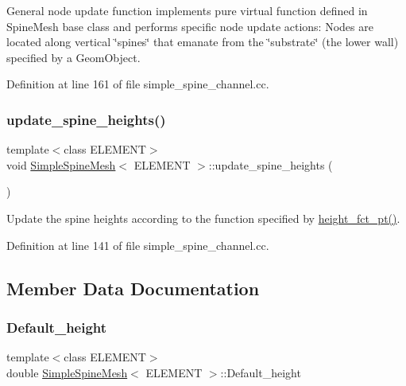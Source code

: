 General node update function implements pure virtual function defined in Spine\+Mesh base class and performs specific node update actions\+: Nodes are located along vertical \char`\"{}spines\char`\"{} that emanate from the \char`\"{}substrate\char`\"{} (the lower wall) specified by a Geom\+Object. 



Definition at line 161 of file simple\+\_\+spine\+\_\+channel.\+cc.

\mbox{\label{classSimpleSpineMesh_a2248fb8df448b0a02377a0cfb6f57851}} 
\subsubsection{\texorpdfstring{update\+\_\+spine\+\_\+heights()}{update\_spine\_heights()}}
{\footnotesize\ttfamily template$<$class E\+L\+E\+M\+E\+NT$>$ \\
void \hyperlink{classSimpleSpineMesh}{Simple\+Spine\+Mesh}$<$ E\+L\+E\+M\+E\+NT $>$\+::update\+\_\+spine\+\_\+heights (\begin{DoxyParamCaption}{ }\end{DoxyParamCaption})\hspace{0.3cm}{\ttfamily [inline]}}



Update the spine heights according to the function specified by \hyperlink{classSimpleSpineMesh_af84290225b4aea3fd6ba27ad979059a0}{height\+\_\+fct\+\_\+pt()}. 



Definition at line 141 of file simple\+\_\+spine\+\_\+channel.\+cc.



\subsection{Member Data Documentation}
\mbox{\label{classSimpleSpineMesh_a7a6d3f655da48ed9d18f6ca8e29f6576}} 
\subsubsection{\texorpdfstring{Default\+\_\+height}{Default\_height}}
{\footnotesize\ttfamily template$<$class E\+L\+E\+M\+E\+NT$>$ \\
double \hyperlink{classSimpleSpineMesh}{Simple\+Spine\+Mesh}$<$ E\+L\+E\+M\+E\+NT $>$\+::Default\+\_\+height\hspace{0.3cm}{\ttfamily [private]}}



